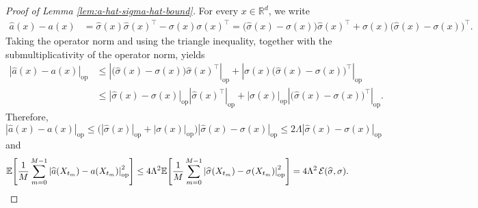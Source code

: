 \documentclass[10pt,a4paper]{amsart}
\newcommand{\EE}{\mathbb{E}}
\newcommand{\RD}{\mathbb{R}^{d}}
\begin{document}
\begin{proof}[Proof of Lemma \ref{lem:a-hat-sigma-hat-bound}]
For every \(x\in\RD\), we write
\begin{align*}
\widehat a(x)-a(x)
&=
\widehat \sigma(x)\widehat \sigma(x)^{\top}
-\sigma(x)\sigma(x)^{\top}=
\bigl(\widehat \sigma(x)-\sigma(x)\bigr)\widehat \sigma(x)^{\top}
+\sigma(x)\bigl(\widehat \sigma(x)-\sigma(x)\bigr)^{\top}.
\end{align*}
Taking the operator norm and using the triangle inequality, together with the submultiplicativity of the operator norm, yields
\begin{align*}
\left|\widehat a(x)-a(x)\right|_{\mathrm{op}}
&\le
\left|\bigl(\widehat \sigma(x)-\sigma(x)\bigr)\widehat \sigma(x)^{\top}\right|_{\mathrm{op}}
+
\left|\sigma(x)\bigl(\widehat \sigma(x)-\sigma(x)\bigr)^{\top}\right|_{\mathrm{op}}\\
&\le
\left|\widehat \sigma(x)-\sigma(x)\right|_{\mathrm{op}}
\left|\widehat \sigma(x)^{\top}\right|_{\mathrm{op}}
+
\left|\sigma(x)\right|_{\mathrm{op}}
\left|\bigl(\widehat \sigma(x)-\sigma(x)\bigr)^{\top}\right|_{\mathrm{op}}.
\end{align*}
Therefore,
\[
\left|\widehat a(x)-a(x)\right|_{\mathrm{op}}
\le
\bigl(
|\widehat \sigma(x)|_{\mathrm{op}}+|\sigma(x)|_{\mathrm{op}}
\bigr)
\left|\widehat \sigma(x)-\sigma(x)\right|_{\mathrm{op}}\le 2\Lambda \left|\widehat \sigma(x)-\sigma(x)\right|_{\mathrm{op}}
\]
and
\[
\EE\!\left[
\frac{1}{M}\sum_{m=0}^{M-1}
\left|\widehat a(X_{t_m})-a(X_{t_m})\right|_{\mathrm{op}}^2
\right]
\le
4\Lambda^2
\EE\!\left[
\frac{1}{M}\sum_{m=0}^{M-1}
\left|\widehat \sigma(X_{t_m})-\sigma(X_{t_m})\right|_{\mathrm{op}}^2
\right]= 4\Lambda^2\,\mathcal E(\widehat \sigma,\sigma). \hfill\qedhere
\]
\end{proof}
\end{document}
